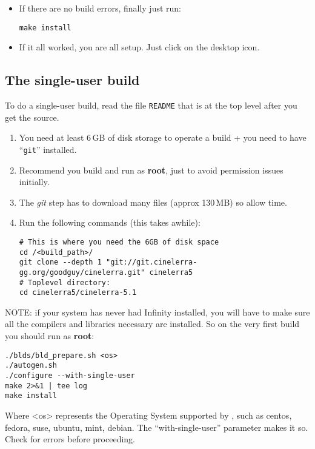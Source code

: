 \begin{itemize}
\item If there are no build errors, finally just run:
\begin{lstlisting}[style=sh]
make install
\end{lstlisting}

\item If it all worked, you are all setup. Just click on the \CGG{}
  desktop icon.
\end{itemize}


\subsection{The single-user build}
\label{sec:single-user-build}

To do a single-user build, read the file \texttt{README} that is at
the top level after you get the source.

\begin{enumerate}
\item You need at least 6\,GB of disk storage to operate a build +
  you need to have “\texttt{git}” installed.

\item Recommend you build and run as \textbf{root}, just to avoid
  permission issues initially.
\item The \textit{git} step has to download many files (approx
  130\,MB) so allow time.

\item Run the following commands (this takes awhile):
\begin{lstlisting}[style=sh]
# This is where you need the 6GB of disk space
cd /<build_path>/
git clone --depth 1 "git://git.cinelerra-gg.org/goodguy/cinelerra.git" cinelerra5
# Toplevel directory:
cd cinelerra5/cinelerra-5.1
\end{lstlisting}
\end{enumerate}

NOTE: if your system has never had \CGG{} Infinity installed, you
will have to make sure all the compilers and libraries necessary are
installed. So on the very first build you should run as
\textbf{root}:

\begin{lstlisting}[style=sh]
./blds/bld_prepare.sh <os>
./autogen.sh
./configure --with-single-user
make 2>&1 | tee log
make install
\end{lstlisting}
Where <os> represents the Operating System supported by \CGG{}, such
as centos, fedora, suse, ubuntu, mint, debian.
The ``with-single-user'' parameter makes it so.
Check for errors before proceeding.



